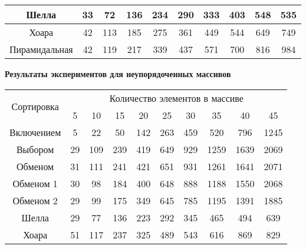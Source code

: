 \documentclass[a4paper,14pt]{extarticle}
\begin{document}
\begin{enumerate}
\begin{center}
\begin{tabular}{|c|c|c|c|c|c|c|c|c|c|}
			      \hline
			      Шелла                       & 33                                                   & 72  & 136 & 234 & 290 & 333 & 403  & 548  & 535  \\
			      \hline
			      Хоара                       & 42                                                   & 113 & 185 & 275 & 361 & 449 & 544  & 649  & 749  \\
			      \hline
			      Пирамидальная               & 42                                                   & 119 & 217 & 339 & 437 & 571 & 700  & 816  & 984  \\ \hline
		      \end{tabular}\bigbreak
		      \textbf{Результаты экспериментов для неупорядоченных массивов}
		      \begin{tabular}{|c|c|c|c|c|c|c|c|c|c|}
			      \hline
			      \multirow{2}{*}{Сортировка} & \multicolumn{9}{|c|}{Количество элементов в массиве}                                                    \\
			      \cline{2-10}
			                                  & 5                                                    & 10  & 15  & 20  & 25  & 30  & 35   & 40   & 45   \\
			      \hline
			      Включением                  & 5                                                    & 22  & 50  & 142 & 263 & 459 & 520  & 796  & 1245 \\
			      \hline
			      Выбором                     & 29                                                   & 109 & 239 & 419 & 649 & 929 & 1259 & 1639 & 2069 \\
			      \hline
			      Обменом                     & 31                                                   & 111 & 241 & 421 & 651 & 931 & 1261 & 1641 & 2071 \\
			      \hline
			      Обменом 1                   & 30                                                   & 98  & 184 & 400 & 648 & 888 & 1188 & 1550 & 2068 \\
			      \hline
			      Обменом 2                   & 29                                                   & 99  & 175 & 349 & 645 & 785 & 1195 & 1391 & 1885 \\
			      \hline
			      Шелла                       & 29                                                   & 77  & 136 & 223 & 292 & 345 & 465  & 494  & 639  \\
			      \hline
			      Хоара                       & 51                                                   & 117 & 237 & 325 & 489 & 543 & 616  & 869  & 829  \\

\end{tabular}
\end{center}
\end{enumerate}
\end{document}
